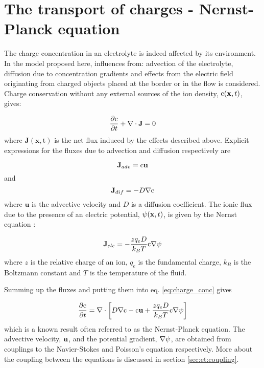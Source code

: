 \section{The transport of charges - Nernst-Planck equation}\label{sec:et:np}
The charge concentration in an electrolyte is indeed affected by its
environment. In the model proposed here, influences from: advection of
the electrolyte, diffusion due to concentration gradients and effects
from the electric field originating from charged objects placed at the
border or in the flow is considered. Charge conservation without any
external sources of the ion density, $\mathrm{c}(\mathbf{x}, t)$, gives:

\begin{equation}\label{eq:charge_conc}
\dfrac{\partial \mathrm{c}}{\partial t} + \nabla \cdot \mathbf{J} = 0
\end{equation}
where $\mathbf{J(\mathbf{x}, \mathrm{t})}$ is the net flux induced
by the effects described above. Explicit expressions for the fluxes
due to advection and diffusion respectively are 

\begin{equation}
\mathbf{J}_{adv} =
\mathrm{c}\mathbf{u}
\end{equation}
and 
\begin{equation}
\mathbf{J}_{dif} = -D\nabla \mathrm{c} 
\end{equation}
where $\mathbf{u}$ is the advective velocity and $D$ is a diffusion
coefficient. The ionic flux due to the presence of an electric
potential, $\mathrm{\psi}(\mathbf{x}, t)$, is given by the Nernst equation
\cite{dongquing-ren-book}:

\begin{equation}
\mathbf{J}_{ele} = -\frac{zq_eD}{k_BT}\mathrm{c}\nabla\mathrm{\psi}
\end{equation}
where $z$ is the relative charge of an ion, $q_e$ is the fundamental
charge, $k_B$ is the Boltzmann constant and $T$ is the temperature of the
fluid.

Summing up the fluxes and putting them into eq. \eqref{eq:charge_conc}
gives

\begin{equation}\label{eq:et:np}
\dfrac{\partial \mathrm{c}}{\partial t} = \nabla \cdot \left [
 D\nabla \mathrm{c} - \mathrm{c}\mathbf{u} + \frac{zq_eD}{k_BT}\mathrm{c}\nabla\mathrm{\psi}
\right]
\end{equation}
which is a known result often referred to as the Nernst-Planck
equation. The advective velocity, $\mathbf{u}$, and the potential gradient,
$\nabla \mathrm{\psi}$, are obtained from couplings to the Navier-Stokes and
Poisson's equation respectively. More about the coupling between the
equations is discussed in section \ref{sec:et:coupling}.

